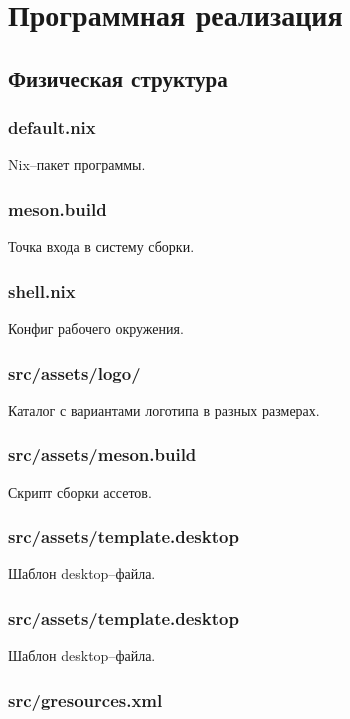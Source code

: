 
\chapter{Программная реализация}

\section{Физическая структура}

\subsection*{default.nix}

Nix--пакет программы.

\subsection{meson.build}

Точка входа в систему сборки.

\subsection{shell.nix}

Конфиг рабочего окружения.

\subsection{src/assets/logo/}

Каталог с вариантами логотипа в разных размерах.

\subsection{src/assets/meson.build}

Скрипт сборки ассетов.

\subsection{src/assets/template.desktop}

Шаблон desktop--файла.

\subsection{src/assets/template.desktop}

Шаблон desktop--файла.

\subsection{src/gresources.xml}

